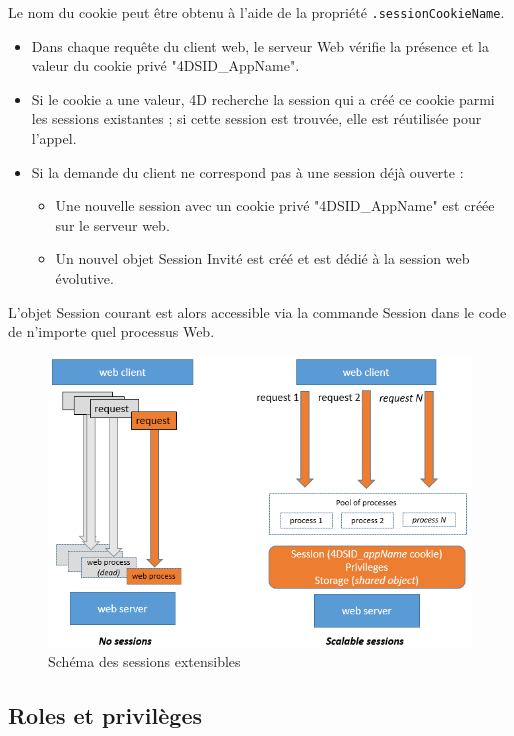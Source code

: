 Le nom du cookie peut être obtenu à l'aide de la propriété \texttt{.sessionCookieName}.



\begin{itemize}[label=$\checkmark$]
    \item Dans chaque requête du client web, le serveur Web vérifie la présence et la valeur du cookie privé "4DSID\_AppName".
    \item Si le cookie a une valeur, 4D recherche la session qui a créé ce cookie parmi les sessions existantes ; si cette session est trouvée, elle est réutilisée pour l'appel.
    \item Si la demande du client ne correspond pas à une session déjà ouverte :
    \begin{itemize}[label=$\bullet$]
        \item Une nouvelle session avec un cookie privé "4DSID\_AppName" est créée sur le serveur web.
        \item Un nouvel objet Session Invité est créé et est dédié à la session web évolutive.
    \end{itemize}
\end{itemize}

L'objet Session courant est alors accessible via la commande Session dans le code de n'importe quel processus Web.


\begin{figure}[H]
    \centering
    \includegraphics[width=19cm]{Figures/session.png}
    \caption{Schéma des sessions extensibles}
\end{figure}

\subsection{Roles et privilèges }

